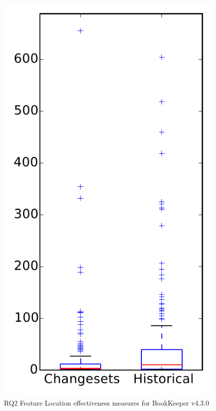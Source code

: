 
\begin{figure}
\centering
\includegraphics[height=0.4\textheight]{figures/flt/rq2_bookkeeper}
\caption{RQ2 Feature Location effectiveness measures for BookKeeper v4.3.0}
\label{fig:flt:rq2:bookkeeper}
\end{figure}
